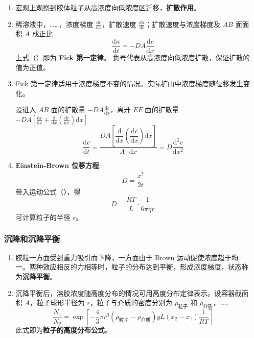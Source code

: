 \begin{enumerate}
    \item 宏观上观察到胶体粒子从高浓度向低浓度区迁移，\textbf{扩散作用}。
    \item 稀溶液中，……，浓度梯度 $\frac{\mathrm{d}c}{\mathrm{d}x}$，扩散速度 $\frac{\mathrm{d}n}{\mathrm{d}t}$；扩散速度与浓度梯度及 $AB$ 面面积 $A$ 成正比
    \begin{equation}
        \frac{\mathrm{d}n}{\mathrm{d}t} = -D A \frac{\mathrm{d}c}{\mathrm{d}x}
    \end{equation}
    上式（）即为 \textbf{Fick 第一定律}。
    负号代表从高浓度向低浓度扩散，保证扩散的值为正值。
    \item Fick 第一定律适用于浓度梯度不变的情况。实际扩山中浓度梯度随位移发生变化。
    
    设进入 $AB$ 面的扩散量 $-D A \frac{\mathrm{d}c}{\mathrm{d}x}$，离开 $EF$ 面的扩散量 $-D A \left[\frac{\mathrm{d}c}{\mathrm{d}x} + \frac{\mathrm{d}}{\mathrm{d}x} \left(\frac{\mathrm{d}c}{\mathrm{d}x}\right) \mathrm{d}x\right]$
    \begin{equation}
        \frac{\mathrm{d}c}{\mathrm{d}t}
        = \frac{D A \left[\dfrac{\mathrm{d}}{\mathrm{d}x} \left(\dfrac{\mathrm{d}c}{\mathrm{d}x}\right) \mathrm{d}x\right]}{A \cdot \mathrm{d}x}
        = D \frac{\mathrm{d^2}c}{\mathrm{d}x^2}
    \end{equation}
    \item \textbf{Einstein-Brown 位移方程}
    \begin{equation}
        D = \frac{\overline{x^2}}{2t}
    \end{equation}
    带入运动公式（），得
    \begin{equation}
        D = \frac{R T}{L} \cdot \frac1{6\pi \eta r}
    \end{equation}
    可计算粒子的半径 $r$。
\end{enumerate}

\subsubsection{沉降和沉降平衡}

\begin{enumerate}
    \item 胶粒一方面受到重力吸引而下降，一方面由于 Brown 运动促使浓度趋于均一。两种效应相反的力相等时，粒子的分布达到平衡，形成浓度梯度，状态称为\textbf{沉降平衡}。
    \item 沉降平衡后，溶胶浓度随高度分布的情况可用高度分布定律表示。设容器截面积 $A$，粒子球形半径为 $r$，粒子与介质的密度分别为 $\rho_{\text{粒子}}$ 和 $\rho_{\text{介质}}$，……
    \begin{equation}
        \frac{N_1}{N_2} = \exp\left[-\frac43 \pi r^3 (\rho_{\text{粒子}} - \rho_{\text{介质}}) g L (x_2 - x_1) \frac1{R T}\right]
    \end{equation}
    此式即为\textbf{粒子的高度分布公式}。
\end{enumerate}

